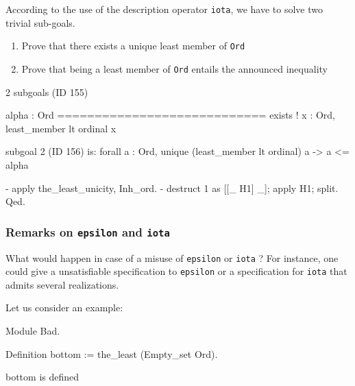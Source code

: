 According to the use of the description operator \texttt{iota}, we have to solve  two trivial sub-goals.
\begin{enumerate}
\item Prove that there exists a unique least member of \texttt{Ord}
\item Prove that being a least member of \texttt{Ord} entails the announced inequality 
\end{enumerate}


\begin{Coqanswer}
2 subgoals (ID 155)
  
  alpha : Ord
  ============================
  exists ! x : Ord, least_member lt ordinal x

subgoal 2 (ID 156) is:
 forall a : Ord, unique (least_member lt ordinal) a -> 
                a <= alpha
\end{Coqanswer}

\begin{Coqsrc}
  -  apply the_least_unicity, Inh_ord.
  -  destruct 1 as [[_ H1] _]; apply H1; split. 
Qed.
\end{Coqsrc}

\subsubsection{Remarks on \texttt{epsilon} and \texttt{iota}}

 What would happen in case of a misuse of \texttt{epsilon} or \texttt{iota} ?
For instance, one could give a unsatisfiable specification to \texttt{epsilon} or 
a specification for \texttt{iota} that admits several realizations.

Let us consider an example:

\begin{Coqbad}
Module Bad.

 Definition bottom := the_least (Empty_set Ord).
\end{Coqbad}

\begin{Coqanswer}
 bottom is defined
\end{Coqanswer}

